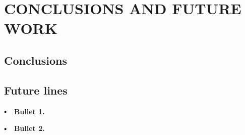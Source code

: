 \setcounter{chapter}{4}
\chapter{CONCLUSIONS AND FUTURE WORK}
\newpage
\section{Conclusions}

\section{Future lines}

$\sbullet[.75] \hspace{0.215cm} $ \textbf{Bullet 1. }

$\sbullet[.75] \hspace{0.215cm} $ \textbf{Bullet 2. }